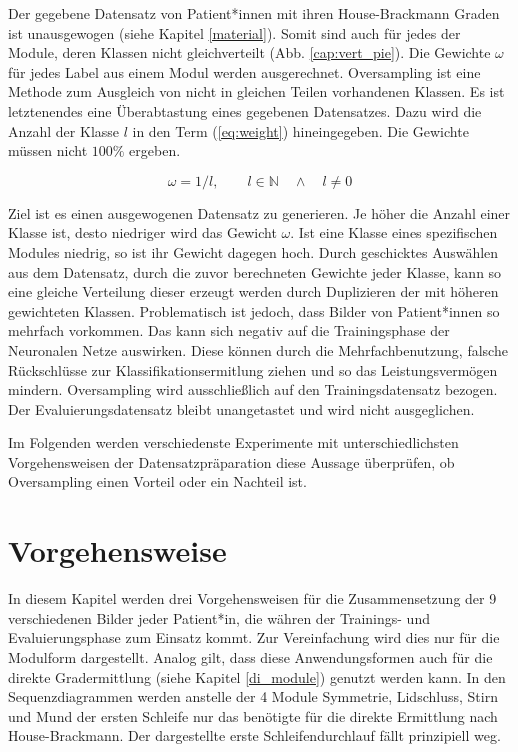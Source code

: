Der gegebene Datensatz von Patient*innen mit ihren House-Brackmann Graden ist unausgewogen (siehe Kapitel \ref{material}). Somit sind auch für jedes der Module, deren Klassen nicht gleichverteilt (Abb. \ref{cap:vert_pie}). Die Gewichte $\omega$ für jedes Label aus einem Modul werden ausgerechnet. Oversampling ist eine Methode zum Ausgleich von nicht in gleichen Teilen vorhandenen Klassen. Es ist letztenendes eine Überabtastung eines gegebenen Datensatzes. Dazu wird die Anzahl der Klasse $l$ in den Term (\ref{eq:weight}) hineingegeben. Die Gewichte müssen nicht $100\%$ ergeben.

\begin{equation}
\omega = 1 / l, \qquad l \in \mathbb{N} \quad \land \quad l \neq 0 \label{eq:weight}
\end{equation}

Ziel ist es einen ausgewogenen Datensatz zu generieren. Je höher die Anzahl einer Klasse ist, desto niedriger wird das Gewicht $\omega$. Ist eine Klasse eines spezifischen Modules niedrig, so ist ihr Gewicht dagegen hoch. Durch geschicktes Auswählen aus dem Datensatz, durch die zuvor berechneten Gewichte jeder Klasse, kann so eine gleiche Verteilung dieser erzeugt werden durch Duplizieren der mit höheren gewichteten Klassen. Problematisch ist jedoch, dass Bilder von Patient*innen so mehrfach vorkommen. Das kann sich negativ auf die Trainingsphase der Neuronalen Netze auswirken. Diese können durch die Mehrfachbenutzung, falsche Rückschlüsse zur Klassifikationsermitlung ziehen und so das Leistungsvermögen mindern. Oversampling wird ausschließlich auf den Trainingsdatensatz bezogen. Der Evaluierungsdatensatz bleibt unangetastet und wird nicht ausgeglichen.

Im Folgenden werden verschiedenste Experimente mit unterschiedlichsten Vorgehensweisen der Datensatzpräparation diese Aussage überprüfen, ob Oversampling einen Vorteil oder ein Nachteil ist.



\clearpage
\section{Vorgehensweise}\label{process}
In diesem Kapitel werden drei Vorgehensweisen für die Zusammensetzung der 9 verschiedenen Bilder jeder Patient*in, die währen der Trainings- und Evaluierungsphase zum Einsatz kommt. Zur Vereinfachung wird dies nur für die Modulform dargestellt. Analog gilt, dass diese Anwendungsformen auch für die direkte Gradermittlung (siehe Kapitel \ref{di_module}) genutzt werden kann. In den Sequenzdiagrammen werden anstelle der 4 Module Symmetrie, Lidschluss, Stirn und Mund der ersten Schleife nur das benötigte für die direkte Ermittlung nach House-Brackmann. Der dargestellte erste Schleifendurchlauf fällt prinzipiell weg.

